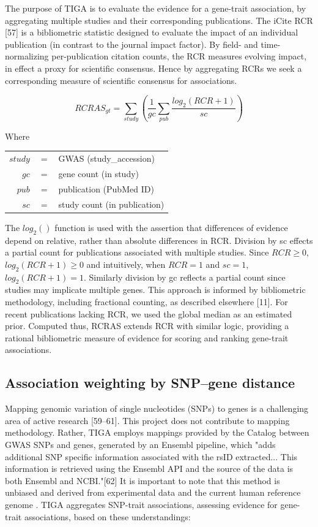 The purpose of TIGA is to evaluate the evidence for a gene-trait association, by aggregating multiple studies and their corresponding publications.  The iCite RCR [57] is a bibliometric statistic designed to evaluate the impact of an individual publication (in contrast to the journal impact factor).  By field- and time-normalizing per-publication citation counts, the RCR measures evolving impact, in effect a proxy for scientific consensus.  Hence by aggregating RCRs we seek a corresponding measure of scientific consensus for associations.

\begin{equation} RCRAS_{gt} = \sum_{study} \left(\frac{1}{gc} \sum_{pub} \frac{log_{2}(RCR + 1)}{sc}\right)
\end{equation}

Where \\
\begin{center}
\begin{tabular}{ r c l }
    $study$ & $=$ & GWAS (study\_accession) \\
	$gc$ & $=$ & gene count (in study)	\\
	$pub$ & $=$ & publication (PubMed ID)	\\
	$sc$ & $=$ & study count (in publication)	\\
\end{tabular}
\end{center}

The $log_2()$ function is used with the assertion that differences of evidence depend on relative, rather than absolute differences in RCR. Division by sc effects a partial count for publications associated with multiple studies.  Since $RCR \geq 0$, $log_2(RCR + 1) \geq 0$ and intuitively, when $RCR = 1$ and $sc = 1$, $log_2(RCR + 1) = 1$. Similarly division by gc reflects a partial count since studies may implicate multiple genes. This approach is informed by bibliometric methodology, including fractional counting, as described elsewhere [11]. For recent publications lacking RCR, we used the global median as an estimated prior. Computed thus, RCRAS extends RCR with similar logic, providing a rational bibliometric measure of evidence for scoring and ranking gene-trait associations. 

\subsection{Association weighting by SNP–gene distance}

Mapping  genomic  variation  of  single  nucleotides  (SNPs)  to  genes  is  a  challenging  area  of active  research [59–61].  This project  does not contribute to mapping methodology.  Rather, TIGA employs mappings provided by the Catalog between GWAS SNPs and genes,  generated by an Ensembl pipeline, which "adds additional SNP specific information associated with the rsID extracted... This information is retrieved using the Ensembl API and the source of the data is both Ensembl and NCBI."[62] It is important to note that this method is unbiased and derived from experimental data and the current human reference genome . TIGA aggregates SNP-trait associations, assessing evidence for gene-trait associations, based on these understandings:

